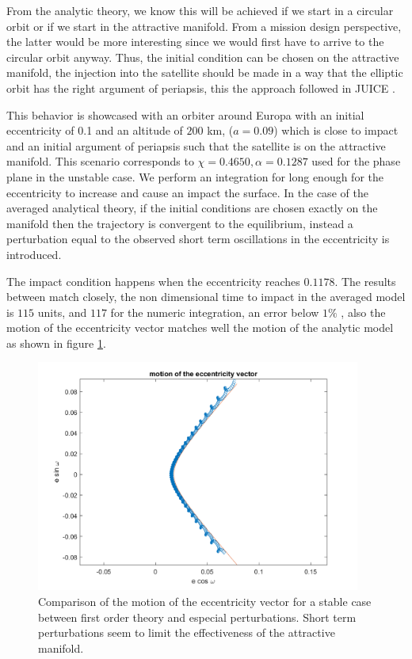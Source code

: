 From the analytic theory, we know this will be achieved if we start in a circular orbit or if we start in the attractive manifold. From a mission design perspective, the latter would be more interesting since we would first have to arrive to the circular orbit anyway. Thus, the initial condition can be chosen on the attractive manifold, the injection into the satellite should be made in a way that the elliptic orbit has the right argument of periapsis, this the approach followed in JUICE \cite{esa2011juice}.

This behavior is showcased with an orbiter around Europa with an initial eccentricity of 0.1 and an altitude of $200$ km, ($a=0.09$) which is close to impact and an initial argument of periapsis such that the satellite is on the attractive manifold. This scenario corresponds to $\chi = 0.4650, \alpha = 0.1287$ used for the phase plane in the unstable case. We perform an integration for long enough for the eccentricity to increase and cause an impact the surface. In the case of the averaged analytical theory, if the initial conditions are chosen exactly on the manifold then the trajectory is convergent to the equilibrium, instead a perturbation equal to the observed short term oscillations in the eccentricity is introduced.

The impact condition happens when the eccentricity reaches $0.1178$. The results between match closely, the non dimensional time to impact in the averaged model is $115$ units, and $117$ for the numeric integration, an error below $1\%$ , also the motion of the eccentricity vector matches well the motion of the analytic model as shown in figure \ref{fig:unstableEccentricityComparison}. 

\begin{figure}[H]
	\centering
	\includegraphics[height=3in]
	{figures/Europa200km01e60i/eccentricityComparison.png}
	\caption{Comparison of the motion of the eccentricity vector for a stable case between first order theory and especial perturbations. Short term perturbations seem to limit the effectiveness of the attractive manifold.}
	\label{fig:unstableEccentricityComparison}
\end{figure}

